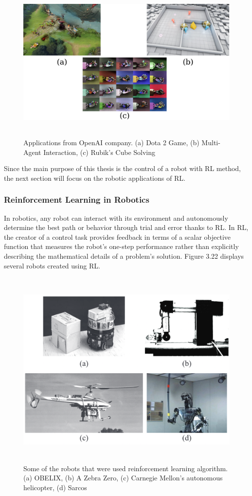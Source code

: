 \documentclass[12pt,twoside,a4]{mwbk}
\begin{document}
\newpage
\begin{figure}[h]
    \centering
    \includegraphics[width=14.0cm, height=8.0cm]{openai.png}
    \caption{Applications from OpenAI company. (a) Dota 2 Game, (b) Multi-Agent Interaction, (c) Rubik's Cube Solving }
\end{figure}

\noindent Since the main purpose of this thesis is the control of a robot with RL method, the next section will focus on the robotic applications of RL.

\subsubsection{Reinforcement Learning in Robotics}
In robotics, any robot can interact with its environment and autonomously determine the best path or behavior through trial and error thanks to RL. In RL, the creator of a control task provides feedback in terms of a scalar objective function that measures the robot's one-step performance rather than explicitly describing the mathematical details of a problem's solution. Figure 3.22 displays several robots created using RL.
\newpage 
\begin{figure}[h]
    \centering
    \includegraphics[width=14.70cm, height=10.0cm]{robots.png}
    \caption{Some of the robots that were used reinforcement learning algorithm. (a) OBELIX, (b) A Zebra Zero, (c) Carnegie Mellon's autonomous helicopter, (d) Sarcos}
\end{figure}
\end{document}

